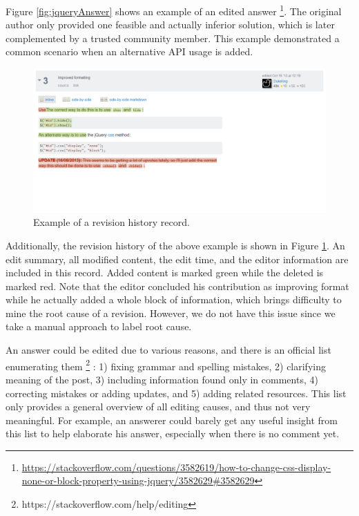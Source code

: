 \documentclass[10pt,conference]{IEEEtran}
\begin{document}
Figure \ref{fig:jqueryAnswer} shows an example of an edited answer%
\footnote{\url{https://stackoverflow.com/questions/3582619/how-to-change-css-display-none-or-block-property-using-jquery/3582629#3582629}}. 
The original author only provided one feasible and actually inferior solution, which is later complemented by a trusted community member. 
This example demonstrated a common scenario when an alternative API usage is added.

\begin{figure}
  \includegraphics[width=\linewidth]{figure2.png}
  \caption{Example of a revision history record.}
  \label{fig:jqueryAnswerRevision}
\end{figure}

Additionally, the revision history of the above example is shown in Figure \ref{fig:jqueryAnswerRevision}. 
An edit summary, all modified content, the edit time, and the editor information are included in this record. 
Added content is marked green while the deleted is marked red. 
Note that the editor concluded his contribution as improving format while he actually added a whole block of information, which brings difficulty to mine the root cause of a revision. 
However, we do not have this issue since we take a manual approach to label root cause.

An answer could be edited due to various reasons, and there is an official list enumerating them \footnote{https://stackoverflow.com/help/editing} : 1) fixing grammar and spelling mistakes, 2) clarifying meaning of the post, 3) including information found only in comments, 4) correcting mistakes or adding updates, and 5) adding related resources. 
This list only provides a general overview of all editing causes, and thus not very meaningful. 
For example, an answerer could barely get any useful insight from this list to help elaborate his answer, especially when there is no comment yet.
\end{document}
